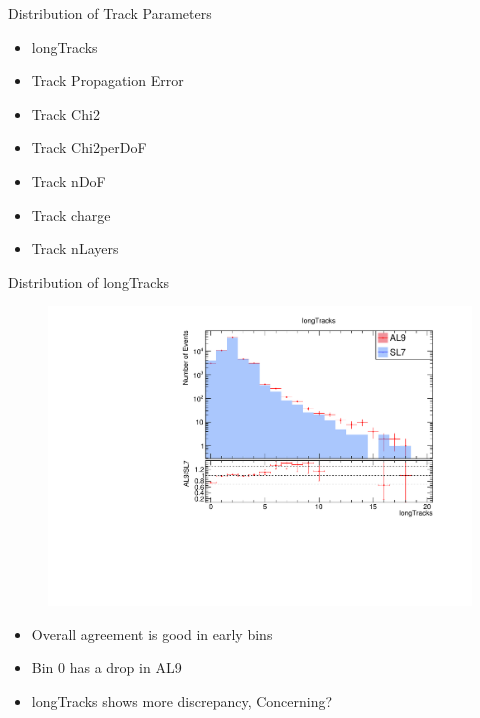 \begin{frame}{Distribution of Track Parameters}
    \centering
    \begin{itemize}
        \item longTracks
        \item Track Propagation Error
        \item Track Chi2
        \item Track Chi2perDoF
        \item Track nDoF
        \item Track charge
        \item Track nLayers
    \end{itemize}
\end{frame}

\begin{frame}{Distribution of longTracks}    
    \begin{figure}        
        \includegraphics[width=0.8\linewidth]{output/longTracks.pdf}
    \end{figure}
    \vspace{-0.5cm}
    \begin{itemize}
        \item Overall agreement is good in early bins
        \item Bin 0 has a drop in AL9
        \item longTracks  shows more discrepancy, Concerning?
    \end{itemize}
\end{frame}


